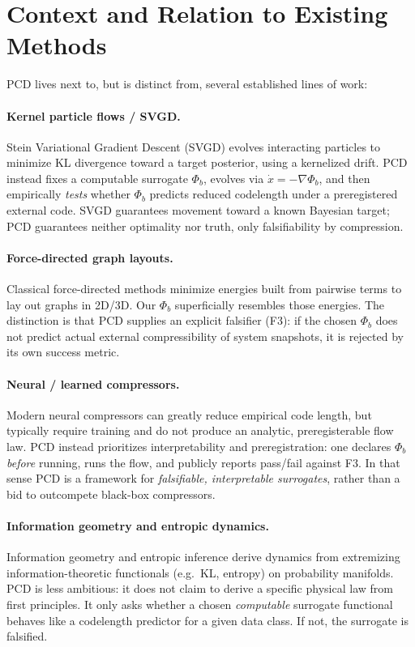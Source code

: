 \documentclass[11pt]{article}
\begin{document}
\section{Context and Relation to Existing Methods}
PCD lives next to, but is distinct from, several established lines of work:

\paragraph{Kernel particle flows / SVGD.}
Stein Variational Gradient Descent (SVGD) \cite{svgd} evolves interacting particles to minimize KL divergence toward a target posterior, using a kernelized drift.
PCD instead fixes a computable surrogate $\Phi_b$, evolves via $\dot{x}{=}{-}\nabla\Phi_b$, and then empirically \emph{tests} whether $\Phi_b$ predicts reduced codelength under a preregistered external code.
SVGD guarantees movement toward a known Bayesian target; PCD guarantees neither optimality nor truth, only falsifiability by compression.

\paragraph{Force-directed graph layouts.}
Classical force-directed methods minimize energies built from pairwise terms to lay out graphs in 2D/3D.
Our $\Phi_b$ superficially resembles those energies.
The distinction is that PCD supplies an explicit falsifier (F3): if the chosen $\Phi_b$ does not predict actual external compressibility of system snapshots, it is rejected by its own success metric.

\paragraph{Neural / learned compressors.}
Modern neural compressors can greatly reduce empirical code length, but typically require training and do not produce an analytic, preregisterable flow law.
PCD instead prioritizes interpretability and preregistration: one declares $\Phi_b$ \emph{before} running, runs the flow, and publicly reports pass/fail against F3.
In that sense PCD is a framework for \emph{falsifiable, interpretable surrogates}, rather than a bid to outcompete black-box compressors.

\paragraph{Information geometry and entropic dynamics.}
Information geometry \cite{amari} and entropic inference \cite{caticha} derive dynamics from extremizing information-theoretic functionals (e.g.\ KL, entropy) on probability manifolds.
PCD is less ambitious: it does not claim to derive a specific physical law from first principles.
It only asks whether a chosen \emph{computable} surrogate functional behaves like a codelength predictor for a given data class.
If not, the surrogate is falsified.
\end{document}
